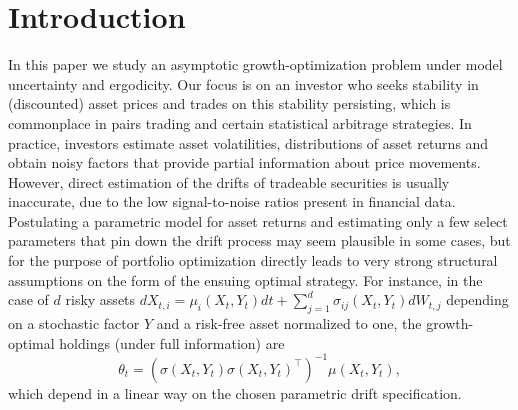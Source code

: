 \documentclass{article}
\theoremstyle{plain}
\theoremstyle{definition}
\numberwithin{lem}{section}
\begin{document}



\section{Introduction}
In this paper we study an asymptotic growth-optimization problem under model uncertainty and ergodicity. Our focus is on an investor who seeks stability in (discounted) asset prices and trades on this stability persisting, which is commonplace in pairs trading and certain statistical arbitrage strategies. In practice, investors estimate asset volatilities, distributions of asset returns and obtain noisy factors that provide partial information about price movements. However, direct estimation of the drifts of tradeable securities is usually inaccurate, due to the low signal-to-noise ratios present in financial data. Postulating a parametric model for asset returns and estimating only a few select parameters that pin down the drift process may seem plausible in some cases, but for the purpose of portfolio optimization directly leads to very strong structural assumptions on the form of the ensuing optimal strategy. For instance, in the case of $d$ risky assets $dX_{t,i} = \mu_i(X_t,Y_t)dt + \sum_{j=1}^d\sigma_{ij}(X_t,Y_t) dW_{t,j}$ depending on a stochastic factor $Y$ and a risk-free asset normalized to one, the growth-optimal holdings (under full information) are 
\begin{equation} \label{eqn:growth_optimal}
    \theta_t = (\sigma(X_t,Y_t) \sigma(X_t,Y_t)^\top)^{-1}\mu(X_t,Y_t),
\end{equation} which depend in a linear way on the chosen parametric drift specification.  
\end{document}
